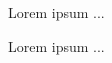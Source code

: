 \documentclass{article}
\begin{document}
Lorem ipsum ...

\begin{center}
	
\end{center}

\begin{center}
	
\end{center}

Lorem ipsum ...
\end{document}
